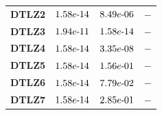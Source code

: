 \documentclass{article}
\begin{document}
\begin{table}[!htp]
\begin{tiny}
\begin{tabular}{c|ccc}
\textbf{DTLZ2} & $\cellcolor{gray25} 1.58e\makebox[0.1cm]{-}14 $ & $ \cellcolor{gray25} 8.49e\makebox[0.1cm]{-}06 $ & $ -$ \\
\textbf{DTLZ3} & $\cellcolor{gray25} 1.94e\makebox[0.1cm]{-}11 $ & $ \cellcolor{gray25} 1.58e\makebox[0.1cm]{-}14 $ & $ -$ \\
\textbf{DTLZ4} & $\cellcolor{gray25} 1.58e\makebox[0.1cm]{-}14 $ & $ \cellcolor{gray25} 3.35e\makebox[0.1cm]{-}08 $ & $ -$ \\
\textbf{DTLZ5} & $\cellcolor{gray25} 1.58e\makebox[0.1cm]{-}14 $ & $ 1.56e\makebox[0.1cm]{-}01 $ & $ -$ \\
\textbf{DTLZ6} & $\cellcolor{gray25} 1.58e\makebox[0.1cm]{-}14 $ & $ 7.79e\makebox[0.1cm]{-}02 $ & $ -$ \\
\textbf{DTLZ7} & $\cellcolor{gray25} 1.58e\makebox[0.1cm]{-}14 $ & $ 2.85e\makebox[0.1cm]{-}01 $ & $ -$ \\
  \hline
  \end{tabular}
  \end{tiny}
\end{table}
\end{document}
